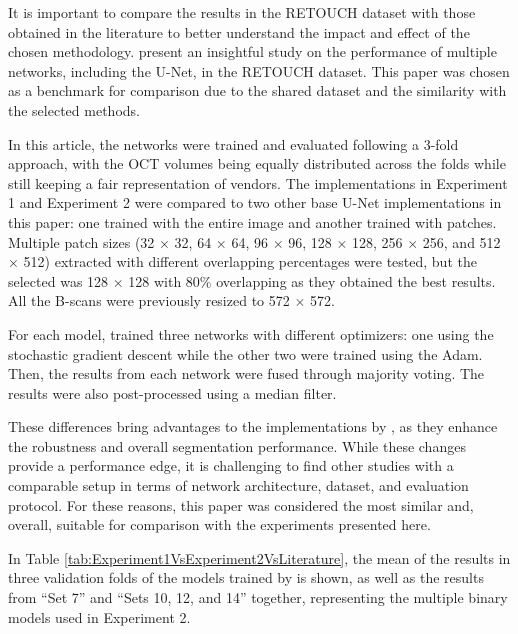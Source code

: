 \par
It is important to compare the results in the RETOUCH dataset with those obtained in the literature to better understand the impact and effect of the chosen methodology. \textcite{Alsaih2020} present an insightful study on the performance of multiple networks, including the U-Net, in the RETOUCH dataset. This paper was chosen as a benchmark for comparison due to the shared dataset and the similarity with the selected methods. 
\par
In this article, the networks were trained and evaluated following a 3-fold approach, with the OCT volumes being equally distributed across the folds while still keeping a fair representation of vendors. The implementations in Experiment 1 and Experiment 2 were compared to two other base U-Net implementations in this paper: one trained with the entire image and another trained with patches. Multiple patch sizes (32 $\times$ 32, 64 $\times$ 64, 96 $\times$ 96, 128 $\times$ 128, 256 $\times$ 256, and 512 $\times$ 512) extracted with different overlapping percentages were tested, but the selected was 128 $\times$ 128 with 80\% overlapping as they obtained the best results. All the B-scans were previously resized to 572 $\times$ 572.
\par
For each model, \textcite{Alsaih2020} trained three networks with different optimizers: one using the stochastic gradient descent while the other two were trained using the Adam. Then, the results from each network were fused through majority voting. The results were also post-processed using a median filter.
\par
These differences bring advantages to the implementations by \textcite{Alsaih2020}, as they enhance the robustness and overall segmentation performance. While these changes provide a performance edge, it is challenging to find other studies with a comparable setup in terms of network architecture, dataset, and evaluation protocol. For these reasons, this paper was considered the most similar and, overall, suitable for comparison with the experiments presented here.
\par
In Table \ref{tab:Experiment1VsExperiment2VsLiterature}, the mean of the results in three validation folds of the models trained by \textcite{Alsaih2020} is shown, as well as the results from ``Set 7'' and ``Sets 10, 12, and 14'' together, representing the multiple binary models used in Experiment 2.


